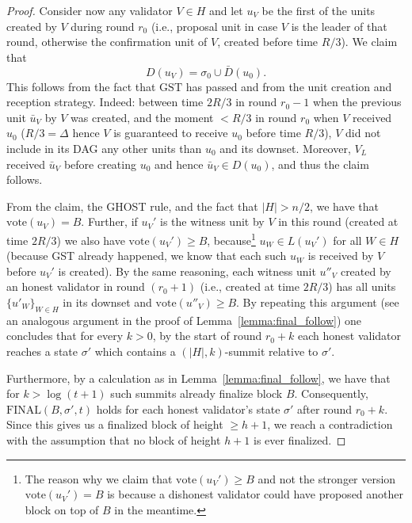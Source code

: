 \documentclass[12pt, fleqn]{article}
\newcommand{\vote}{\mathrm{vote}}
\newcommand{\final}{\mathrm{FINAL}}
\newcommand{\gst}{\mathrm{GST}}
\begin{document}
\begin{proof}
Consider now any validator $V\in H$ and let $u_V$ be the first of the units created by $V$ during round $r_0$ (i.e., proposal unit in case $V$ is the leader of that round, otherwise the confirmation unit of $V$, created before time $R/3$).
%
We claim that $$D(u_V) = \sigma_0 \cup \bar{D}(u_0).$$
This follows from the fact that $\gst$ has passed and from the unit creation and reception strategy.
%
Indeed: between time $2R/3$ in round $r_0-1$ when the previous unit $\bar{u}_V$ by $V$ was created, and the moment $<R/3$ in round $r_0$ when $V$ received $u_0$ ($R/3=\Delta$ hence $V$ is guaranteed to receive $u_0$ before time $R/3$), $V$ did not include in its DAG any other units than $u_0$ and its downset.
%
Moreover, $V_L$ received $\bar{u}_V$ before creating $u_0$ and hence $\bar{u}_V \in D(u_0)$, and thus the claim follows.

From the claim, the GHOST rule, and the fact that $|H|>n/2$, we have that $\vote(u_V)=B$.
%
Further, if $u_V'$ is the witness unit by $V$ in this round  (created at time $2R/3$) we also have $\vote(u_V')\geq B$, because\footnote{The reason why we claim that $\vote(u_V') \geq B$ and not the stronger version $\vote(u_V')=B$ is because a dishonest validator could have proposed another block on top of $B$ in the meantime.} $u_W\in L(u_V')$ for all $W\in H$ (because GST already happened, we know that each such $u_W$ is received by $V$ before $u_V'$ is created).
%
By the same reasoning, each witness unit $u''_V$ created by an honest validator in round $(r_0+1)$ (i.e., created at time $2R/3$) has all units $\{u'_W\}_{W\in H}$ in its downset and $\vote(u''_V)\geq B$.
%
By repeating this argument (see an analogous argument in the proof of Lemma~\ref{lemma:final_follow}) one concludes that for every $k>0$, by the start of round $r_0+k$ each honest validator reaches a state $\sigma'$ which contains a $(|H|, k)$-summit relative to $\sigma'$. 

Furthermore, by a calculation as in Lemma~\ref{lemma:final_follow}, we have that for $k>\log(t+1)$ such summits already finalize block $B$.
%
Consequently, $\final(B, \sigma', t)$ holds for each honest validator's state $\sigma'$ after round $r_0+k$.
%
Since this gives us a finalized block of height $\geq h+1$, we reach a contradiction with the assumption that no block of height $h+1$ is ever finalized.
\end{proof}
\end{document}
